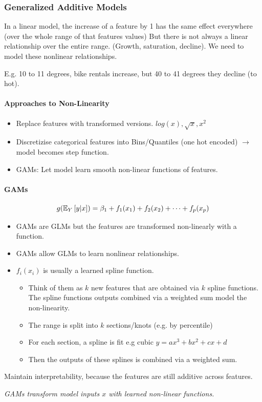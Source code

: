 \subsubsection{Generalized Additive Models}
In a linear model, the increase of a feature by 1 has the same effect everywhere (over the whole range of that features values)
But there is not always a linear relationship over the entire range. (Growth, saturation, decline). We need to model these nonlinear relationships.

E.g. 10 to 11 degrees, bike rentals increase, but 40 to 41 degrees they decline (to hot).
\paragraph{Approaches to Non-Linearity}
\begin{itemize}
	\item Replace features with transformed versions. $log(x), \sqrt{x}, x^2$
	\item Discretizise categorical features into Bins/Quantiles (one hot encoded) $\to$ model becomes step function.
	\item GAMs: Let model learn smooth non-linear functions of features.
\end{itemize}

\paragraph{GAMs}
\begin{equation}
	g(\mathbb{E}_{Y}\left[ y|x \right]) = \beta_{1} + f_1(x_1) + f_2(x_2) + \dots + f_p(x_p)
	\label{eq:GAM}
\end{equation}
\begin{itemize}
	\item GAMs are GLMs but the features are transformed non-linearly with a function.
	\item GAMs allow GLMs to learn nonlinear relationships.
	\item $f_i(x_i)$ is usually a learned spline function.
	      \begin{itemize}
		      \item Think of them as $k$ new features that are obtained via $k$ spline functions. The spline functions outputs combined via a weighted sum model the non-linearity.
		      \item The range is split into $k$ sections/knots (e.g. by percentile)
		      \item For each section, a spline is fit e.g cubic $y = ax^3 + bx^2 + cx + d$
		      \item Then the outputs of these splines is combined via a weighted sum.
	      \end{itemize}
\end{itemize}

Maintain interpretability, because the features are still additive across features.


\textit{GAMs transform model inputs $x$ with learned non-linear functions.}


